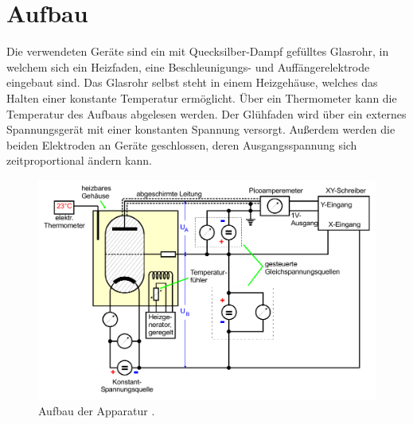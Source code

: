 \section{Aufbau}
\label{sec:Aufbau}

Die verwendeten Geräte sind ein mit Quecksilber-Dampf gefülltes Glasrohr, in welchem sich ein Heizfaden, eine Beschleunigungs- und Auffängerelektrode eingebaut sind.
Das Glasrohr selbst steht in einem Heizgehäuse, welches das Halten einer konstante Temperatur ermöglicht. Über ein Thermometer kann die Temperatur des Aufbaus abgelesen werden.
Der Glühfaden wird über ein externes Spannungsgerät mit einer konstanten Spannung versorgt. Außerdem werden die beiden Elektroden an Geräte geschlossen, deren 
Ausgangsspannung sich zeitproportional ändern kann.
\begin{figure}
    \centering
    \includegraphics[width = 10 cm]{Aufbau.pdf}
    \caption{Aufbau der Apparatur \cite{ap601}.}
    \label{fig:AufbauMessung}
\end{figure}

